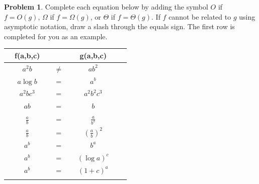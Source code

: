 \documentclass[10pt]{article}
\theoremstyle{definition}
\newtheorem{problem}{Problem}
\begin{document}
\newpage
\begin{problem}
    Complete each equation below by adding the symbol $O$ if $f=O(g)$, $\Omega$ if $f=\Omega(g)$, or $\Theta$ if $f=\Theta(g)$.  
    If $f$ cannot be related to $g$ using asymptotic notation, draw a slash through the equals sign.
    The first row is completed for you as an example.

{\renewcommand{\arraystretch}{4.4}
\begin{tabular}{c c c c c c}
    & f(a,b,c) &~\hspace{0.5in}~$ $~\hspace{0.5in}~& g(a,b,c) &\\
    \hline
    & $a^2b$ & ~\hspace{0.5in}~$\ne$~\hspace{0.5in}~  & $ab^2$ &  &\\
    \arrayrulecolor{gray}\hline
    & $a\log b$ & ~\hspace{0.5in}~$=$~\hspace{0.5in}~  & $a^b$ &  &\\
    \arrayrulecolor{gray}\hline
    & $a^2bc^3$ & ~\hspace{0.5in}~$=$~\hspace{0.5in}~  & $a^2b^2c^3$ &  &\\
    \arrayrulecolor{gray}\hline
    & $ab$ & ~\hspace{0.5in}~$=$~\hspace{0.5in}~  & $b$ &  &\\
    \arrayrulecolor{gray}\hline
    & $\frac ab$ & ~\hspace{0.5in}~$=$~\hspace{0.5in}~  & $\frac a {b^2}$ &  &\\
    \arrayrulecolor{gray}\hline
    & $\frac ab$ & ~\hspace{0.5in}~$=$~\hspace{0.5in}~  & $(\frac a b)^2$ &  &\\
    \arrayrulecolor{gray}\hline
    & $a^b$ & ~\hspace{0.5in}~$=$~\hspace{0.5in}~  & $b^a$ &  &\\
    \arrayrulecolor{gray}\hline
    & $a^b$ & ~\hspace{0.5in}~$=$~\hspace{0.5in}~  & $(\log a)^c$ &  &\\
    \arrayrulecolor{gray}\hline
    & $a^b$ & ~\hspace{0.5in}~$=$~\hspace{0.5in}~  & $(1+c)^a$ &  &\\
    \arrayrulecolor{gray}\hline


\end{tabular}}
\end{problem}
\end{document}
